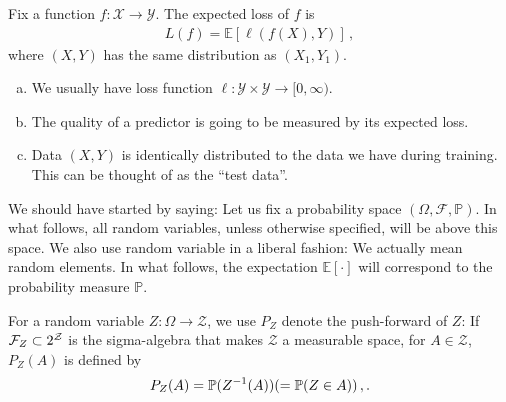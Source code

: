 \documentclass[twoside]{article}
\begin{document}
\begin{definition}
    Fix a function $f: \mathcal{X}\rightarrow \mathcal{Y}$.
	The expected loss of $f$ is 
    \begin{align*}
        L(f) = \mathbb{E}[ \ell(f(X),Y) ]\,, %
    \end{align*}
    where $(X,Y)$ has the same distribution as $(X_1,Y_1)$.
\end{definition}

\begin{remark}\mbox{}
\begin{enumerate}[(a)]
\item We usually have loss function $\ell: \mathcal{Y} \times \mathcal{Y} \rightarrow [0, \infty)$.
\item The quality of a predictor is going to be measured by its expected loss.
\item Data $(X,Y)$ is identically distributed to the data we have during training.
This can be thought of as the ``test data''.
\end{enumerate}
\end{remark}


\begin{remark}
We should have started by saying: Let us fix a probability space
$(\Omega, \mathcal{F}, \mathbb{P})$.
In what follows, all random variables, unless otherwise specified, will be above this space.
We also use random variable in a liberal fashion: We actually mean random elements.
In what follows, the expectation $\mathbb{E}[\cdot]$ will correspond to the probability measure
$\mathbb{P}$.
\end{remark}


\begin{definition}
For a random variable
$Z:\Omega \rightarrow \mathcal{Z}$,  we use $P_Z$ denote the push-forward of $Z$:
If $\mathcal{F}_Z\subset 2^{\mathcal{Z}}$ is the sigma-algebra that makes $\mathcal{Z}$ a measurable space,
for $A\in \mathcal{Z}$,
$P_Z(A)$ is defined by 
\begin{align*}
P_Z(A) = \mathbb{P}( Z^{-1}(A) ) (=\mathbb{P}(Z\in A))\,,.
\end{align*}
\end{definition}
 
\end{document}
